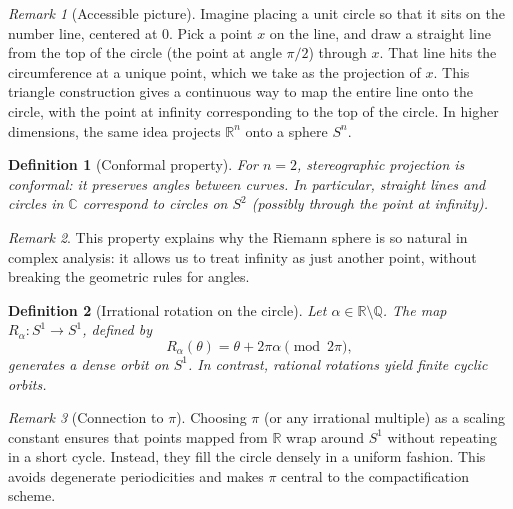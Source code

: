 \documentclass[12pt]{article}
\newtheorem{definition}{Definition}
\theoremstyle{remark}
\newtheorem*{remark}{Remark}
\begin{document}
\begin{remark}[Accessible picture]
Imagine placing a unit circle so that it sits on the number line, centered at 0. 
Pick a point $x$ on the line, and draw a straight line from the top of the circle 
(the point at angle $\pi/2$) through $x$. That line hits the circumference at 
a unique point, which we take as the projection of $x$. This triangle construction 
gives a continuous way to map the entire line onto the circle, with the 
point at infinity corresponding to the top of the circle. In higher dimensions, 
the same idea projects $\mathbb{R}^n$ onto a sphere $S^n$.
\end{remark}

\begin{definition}[Conformal property]
For $n=2$, stereographic projection is conformal: it preserves angles between 
curves. In particular, straight lines and circles in $\mathbb{C}$ correspond to 
circles on $S^2$ (possibly through the point at infinity).
\end{definition}

\begin{remark}
This property explains why the Riemann sphere is so natural in complex analysis: 
it allows us to treat infinity as just another point, without breaking the 
geometric rules for angles.
\end{remark}

\begin{definition}[Irrational rotation on the circle]
Let $\alpha \in \mathbb{R} \setminus \mathbb{Q}$. The map 
$R_\alpha : S^1 \to S^1$, defined by 
\[
R_\alpha(\theta) = \theta + 2\pi \alpha \pmod{2\pi},
\]
generates a dense orbit on $S^1$. In contrast, rational rotations yield finite 
cyclic orbits.
\end{definition}

\begin{remark}[Connection to $\pi$]
Choosing $\pi$ (or any irrational multiple) as a scaling constant ensures that 
points mapped from $\mathbb{R}$ wrap around $S^1$ without repeating in a short 
cycle. Instead, they fill the circle densely in a uniform fashion. This avoids 
degenerate periodicities and makes $\pi$ central to the compactification scheme.
\end{remark}


\end{document}
